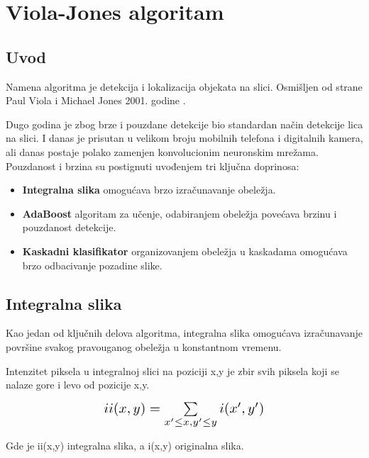 \section{Viola-Jones algoritam}

\subsection{Uvod}

Namena algoritma je detekcija i lokalizacija objekata na slici. Osmišljen od
strane Paul Viola i Michael Jones 2001. godine \cite{Viola2001RapidOD}.

Dugo godina je zbog brze i pouzdane detekcije bio standardan način detekcije
lica na slici. I danas je prisutan u velikom broju mobilnih telefona i
digitalnih kamera, ali danas postaje polako zamenjen konvolucionim neuronskim
mrežama. \\

Pouzdanost i brzina su postignuti uvođenjem tri ključna doprinosa:
\begin{itemize}

\item \textbf{Integralna slika} omogućava brzo izračunavanje obeležja.
\item \textbf{AdaBoost} algoritam za učenje, odabiranjem obeležja povećava
  brzinu i pouzdanost detekcije.
\item \textbf{Kaskadni klasifikator} organizovanjem obeležja u kaskadama
  omogućava brzo odbacivanje pozadine slike. \\
\end{itemize}


\subsection{Integralna slika}

Kao jedan od ključnih delova algoritma, integralna slika omogućava izračunavanje
površine svakog pravouganog obeležja u konstantnom vremenu.

Intenzitet piksela u integralnoj slici na poziciji x,y je zbir svih piksela koji
se nalaze gore i levo od pozicije x,y.

\begin{equation}
  \Scale[1.4]{ii(x,y)=\sum\limits_{x'\leq x, y'\leq y} i(x',y')}
  \label{IntegralImage_eq1}
\end{equation}

Gde je ii(x,y) integralna slika, a i(x,y) originalna slika. \\

